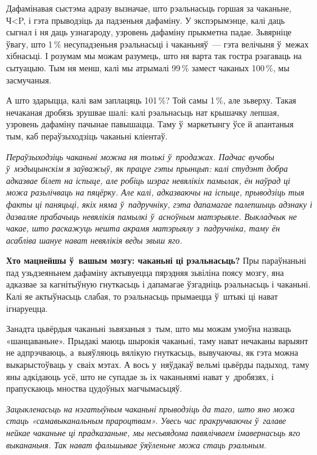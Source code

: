 Дафамінавая сыстэма адразу вызначае, што рэальнасьць горшая за чаканьне, Ч<P, і гэта прыводзіць да падзеньня дафаміну. У экспэрымэнце, калі даць сыгнал і ня даць узнагароду, узровень дафаміну прыкметна падае. Зьвярніце ўвагу, што 1\,\% несупадзеньня рэальнасьці і чаканьняў~--- гэта велічыня ў~межах хібнасьці. І розумам мы можам разумець, што ня варта так гостра рэагаваць на сытуацыю. Тым ня менш, калі мы атрымалі 99\,\% замест чаканых 100\,\%, мы засмучаныя.

А што здарыцца, калі вам заплацяць 101\,\%? Той самы 1\,\%, але зьверху. Такая нечаканая дробязь зрушвае шалі: калі рэальнасьць нат крышачку лепшая, узровень дафаміну пачынае павышацца. Таму ў~маркетынгу ўсе й апантаныя тым, каб пераўзыходзіць чаканьні кліентаў.

\emph{Пераўзыходзіць чаканьні можна ня толькі ў~продажах. Падчас вучобы ў~мэдыцынскім я заўважыў, як працуе гэты прынцып: калі студэнт добра адказвае білет на іспыце, але робіць шэраг невялікіх памылак, ён наўрад ці можа разьлічваць на пяцёрку. Але калі, адказваючы на іспыце, прыводзіць тыя факты ці паняцьці, якіх няма ў~падручніку, гэта дапамагае палепшыць адзнаку і дазваляе прабачыць невялікія памылкі ў~асноўным матэрыяле. Выкладчык не чакае, што раскажуць нешта акрамя матэрыялу з~падручніка, таму ён асабліва шануе нават невялікія веды звыш яго.}

\textbf{Хто мацнейшы ў~вашым мозгу: чаканьні ці рэальнасьць?} Пры параўнаньні пад узьдзеяньнем дафаміну актывуецца пярэдняя зьвіліна поясу мозгу, яна адказвае за кагнітыўную гнуткасьць і дапамагае ўзгадніць рэальнасьць і чаканьні. Калі яе актыўнасьць слабая, то рэальнасьць прымаецца ў~штыкі ці нават ігнаруецца.


Занадта цьвёрдыя чаканьні зьвязаныя з~тым, што мы можам умоўна назваць «шанцаваньне». Прыдакі маюць шырокія чаканьні, таму нават нечаканы варыянт не адпрэчваюць, а~выяўляюць вялікую гнуткасьць, вывучаючы, як гэта можна выкарыстоўваць у~сваіх мэтах. А вось у~няўдакаў вельмі цьвёрды падыход, таму яны адкідаюць усё, што не супадае зь іх чаканьнямі нават у~дробязях, і прапускаюць мноства цудоўных магчымасьцяў.

\emph{Зацыкленасьць на нэгатыўным чаканьні прыводзіць да таго, што яно можа стаць «самавыканальным прароцтвам». Увесь час пракручваючы ў~галаве нейкае чаканьне ці прадказаньне, мы несьвядома павялічваем імавернасьць яго выкананьня. Так нават фальшывае ўяўленьне можа стаць рэальным.}

